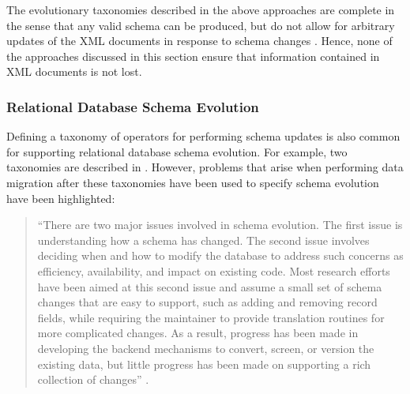 The \cc evolutionary taxonomies described in the above approaches are complete in the sense that any valid schema can be produced, but do not allow for arbitrary updates of the XML documents in response to schema changes \cite{pizka07automating}. Hence, none of the approaches discussed in this section ensure that information contained in XML documents is not lost.


\subsubsection{Relational Database Schema Evolution}
\label{LitReview:RdbsSchemaEvo}
Defining a taxonomy of operators for performing schema updates is also common for supporting relational database schema evolution. For example, two taxonomies are described in \cite{edelweiss05temporal,banerjee87semantics}. However, problems that arise when performing data migration after these taxonomies have been used to specify schema evolution have been highlighted:

 \begin{quote}
 ``There are two major issues involved in schema evolution. The first issue is understanding how a schema has changed. The second issue involves deciding when and how to modify the database to address such concerns as efficiency, availability, and impact on existing code. Most research efforts have been aimed at this second issue and assume a small set of schema changes that are easy to support, such as adding and removing record fields, while requiring the maintainer to provide translation routines for more complicated changes. As a result, progress has been made in developing the backend mechanisms to convert, screen, or version the existing data, but little progress has been made on supporting a rich collection of changes'' \cite[pg. 84]{lerner00model}.
 \end{quote}

